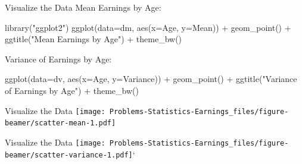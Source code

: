 \documentclass[
  11pt,
  ignorenonframetext,
  svgnames, handout, t]{beamer}
\newenvironment{Shaded}{\begin{snugshade}}{\end{snugshade}}
\newcommand{\AttributeTok}[1]{\textcolor[rgb]{0.77,0.63,0.00}{#1}}
\newcommand{\FunctionTok}[1]{\textcolor[rgb]{0.00,0.00,0.00}{#1}}
\newcommand{\NormalTok}[1]{#1}
\newcommand{\SpecialCharTok}[1]{\textcolor[rgb]{0.00,0.00,0.00}{#1}}
\newcommand{\StringTok}[1]{\textcolor[rgb]{0.31,0.60,0.02}{#1}}
\begin{document}
\begin{frame}[fragile]{Visualize the Data}
\protect\hypertarget{visualize-the-data}{}
Mean Earnings by Age:

\footnotesize

\begin{Shaded}
\begin{Highlighting}[]
\FunctionTok{library}\NormalTok{(}\StringTok{"ggplot2"}\NormalTok{)}
\FunctionTok{ggplot}\NormalTok{(}\AttributeTok{data=}\NormalTok{dm, }\FunctionTok{aes}\NormalTok{(}\AttributeTok{x=}\NormalTok{Age, }\AttributeTok{y=}\NormalTok{Mean)) }\SpecialCharTok{+}
    \FunctionTok{geom\_point}\NormalTok{() }\SpecialCharTok{+}
    \FunctionTok{ggtitle}\NormalTok{(}\StringTok{"Mean Earnings by Age"}\NormalTok{) }\SpecialCharTok{+}
    \FunctionTok{theme\_bw}\NormalTok{()}
\end{Highlighting}
\end{Shaded}

\normalsize

Variance of Earnings by Age:

\footnotesize

\begin{Shaded}
\begin{Highlighting}[]
\FunctionTok{ggplot}\NormalTok{(}\AttributeTok{data=}\NormalTok{dv, }\FunctionTok{aes}\NormalTok{(}\AttributeTok{x=}\NormalTok{Age, }\AttributeTok{y=}\NormalTok{Variance)) }\SpecialCharTok{+}
    \FunctionTok{geom\_point}\NormalTok{() }\SpecialCharTok{+}
    \FunctionTok{ggtitle}\NormalTok{(}\StringTok{"Variance of Earnings by Age"}\NormalTok{) }\SpecialCharTok{+}
    \FunctionTok{theme\_bw}\NormalTok{()}
\end{Highlighting}
\end{Shaded}

\normalsize
\end{frame}

\begin{frame}{Visualize the Data}
\protect\hypertarget{visualize-the-data-1}{}
\texttt{[image: Problems-Statistics-Earnings\_files/figure-beamer/scatter-mean-1.pdf]}
\end{frame}

\begin{frame}{Visualize the Data}
\protect\hypertarget{visualize-the-data-2}{}
\texttt{[image: Problems-Statistics-Earnings\_files/figure-beamer/scatter-variance-1.pdf]}`
\end{frame}
\end{document}
